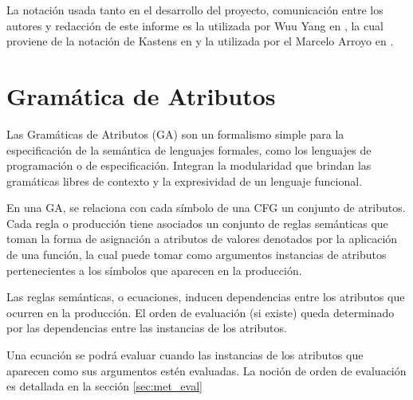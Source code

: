 La notación usada tanto en el desarrollo del proyecto, comunicación entre los autores y redacción de este informe es la utilizada por Wuu Yang en \cite{wuu-yang1}, la cual proviene de la notación de Kastens en \cite{kastens} y la utilizada por el Marcelo Arroyo en \cite{tesismarcelo}.

\section{Gramática de Atributos}

Las Gramáticas de Atributos (GA) son un formalismo simple para la especificación de la semántica de lenguajes formales, como los lenguajes de programación o de especificación. Integran la modularidad que brindan las gramáticas libres de contexto y la expresividad de un lenguaje funcional.

En una GA, se relaciona con cada símbolo de una CFG un conjunto de atributos. Cada regla o producción tiene asociados un conjunto de reglas semánticas que toman la forma de asignación a atributos de valores denotados por la aplicación de una función, la cual puede tomar como argumentos instancias de atributos pertenecientes a los símbolos que aparecen en la producción.

Las reglas semánticas, o ecuaciones, inducen dependencias entre los atributos que ocurren en la producción. El orden de evaluación (si existe) queda determinado por las dependencias entre las instancias de los atributos.

Una ecuación se podrá evaluar cuando las instancias de los atributos que aparecen como sus argumentos estén evaluadas. La noción de orden de evaluación es detallada en la sección \ref{sec:met_eval}

